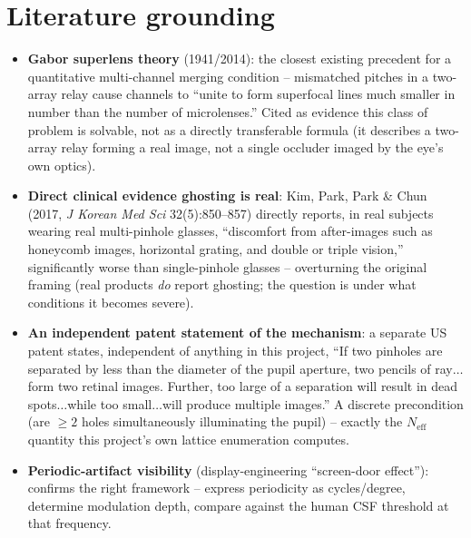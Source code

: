 \documentclass[11pt]{report}
\newcommand{\Neff}{N_{\text{eff}}}
\begin{document}
\section{Literature grounding}
\begin{itemize}[nosep]
\item \textbf{Gabor superlens theory} (1941/2014): the closest existing precedent for a
quantitative multi-channel merging condition -- mismatched pitches in a two-array relay
cause channels to ``unite to form superfocal lines much smaller in number than the number of
microlenses.'' Cited as evidence this class of problem is solvable, not as a directly
transferable formula (it describes a two-array relay forming a real image, not a single
occluder imaged by the eye's own optics).
\item \textbf{Direct clinical evidence ghosting is real}: Kim, Park, Park \& Chun (2017, \emph{J
Korean Med Sci} 32(5):850--857) directly reports, in real subjects wearing real multi-pinhole
glasses, ``discomfort from after-images such as honeycomb images, horizontal grating, and
double or triple vision,'' significantly worse than single-pinhole glasses -- overturning the
original framing (real products \emph{do} report ghosting; the question is under what
conditions it becomes severe).
\item \textbf{An independent patent statement of the mechanism}: a separate US patent states,
independent of anything in this project, ``If two pinholes are separated by less than the
diameter of the pupil aperture, two pencils of ray$\ldots$form two retinal images. Further,
too large of a separation will result in dead spots$\ldots$while too small$\ldots$will
produce multiple images.'' A discrete precondition (are $\geq2$ holes simultaneously
illuminating the pupil) -- exactly the $\Neff$ quantity this project's own lattice
enumeration computes.
\item \textbf{Periodic-artifact visibility} (display-engineering ``screen-door effect''):
confirms the right framework -- express periodicity as cycles/degree, determine modulation
depth, compare against the human CSF threshold at that frequency.
\end{itemize}
\end{document}
